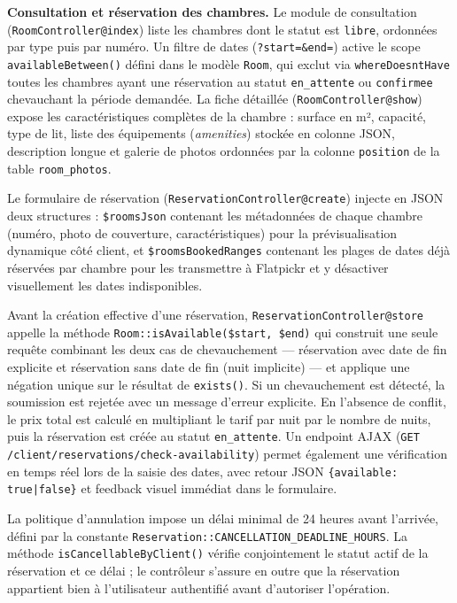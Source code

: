 \documentclass[12pt,a4paper]{report}
\begin{document}
\textbf{Consultation et réservation des chambres.} Le module de consultation
(\texttt{RoomController@index}) liste les chambres dont le statut est
\texttt{libre}, ordonnées par type puis par numéro. Un filtre de dates
(\texttt{?start=\&end=}) active le scope \texttt{availableBetween()} défini
dans le modèle \texttt{Room}, qui exclut via \texttt{whereDoesntHave}
toutes les chambres ayant une réservation au statut \texttt{en\_attente}
ou \texttt{confirmee} chevauchant la période demandée. La fiche détaillée
(\texttt{RoomController@show}) expose les caractéristiques complètes de la
chambre : surface en m², capacité, type de lit, liste des équipements
(\textit{amenities}) stockée en colonne JSON, description longue et galerie
de photos ordonnées par la colonne \texttt{position} de la table
\texttt{room\_photos}.

Le formulaire de réservation (\texttt{ReservationController@create})
injecte en JSON deux structures : \texttt{\$roomsJson} contenant les
métadonnées de chaque chambre (numéro, photo de couverture, caractéristiques)
pour la prévisualisation dynamique côté client, et \texttt{\$roomsBookedRanges}
contenant les plages de dates déjà réservées par chambre pour les transmettre
à Flatpickr et y désactiver visuellement les dates indisponibles.

Avant la création effective d'une réservation, \texttt{ReservationController@store}
appelle la méthode \texttt{Room::isAvailable(\$start, \$end)} qui construit
une seule requête combinant les deux cas de chevauchement --- réservation
avec date de fin explicite et réservation sans date de fin (nuit implicite)
--- et applique une négation unique sur le résultat de \texttt{exists()}.
Si un chevauchement est détecté, la soumission est rejetée avec un message
d'erreur explicite. En l'absence de conflit, le prix total est calculé en
multipliant le tarif par nuit par le nombre de nuits, puis la réservation
est créée au statut \texttt{en\_attente}. Un endpoint AJAX
(\texttt{GET /client/reservations/check-availability}) permet également
une vérification en temps réel lors de la saisie des dates, avec retour
JSON \texttt{\{available: true|false\}} et feedback visuel immédiat dans
le formulaire.

La politique d'annulation impose un délai minimal de 24 heures avant
l'arrivée, défini par la constante \texttt{Reservation::CANCELLATION\_DEADLINE\_HOURS}.
La méthode \texttt{isCancellableByClient()} vérifie conjointement le statut
actif de la réservation et ce délai ; le contrôleur s'assure en outre que
la réservation appartient bien à l'utilisateur authentifié avant d'autoriser
l'opération.
\end{document}
